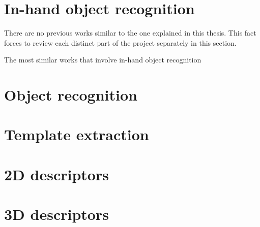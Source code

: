 \section{In-hand object recognition}
There are no previous works similar to the one explained in this thesis. This fact forces to review each distinct part of the project separately in this section. 

The most similar works that involve in-hand object recognition 

\section{Object recognition}

\section{Template extraction}

\section{2D descriptors}

\section{3D descriptors}

